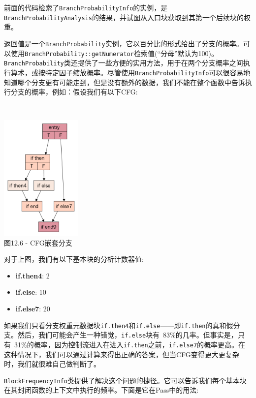 前面的代码检索了\texttt{BranchProbabilityInfo}的实例，是\texttt{BranchProbabilityAnalysis}的结果，并试图从入口块获取到其第一个后续块的权重。

返回值是一个\texttt{BranchProbability}实例，它以百分比的形式给出了分支的概率。可以使用\texttt{BranchProbability::getNumerator}检索值(“分母”默认为100)。\texttt{BranchProbability}类还提供了一些方便的实用方法，用于在两个分支概率之间执行算术，或按特定因子缩放概率。尽管使用\texttt{BranchProbabilityInfo}可以很容易地知道哪个分支更有可能走到，但是没有额外的数据，我们不能在整个函数中告诉执行分支的概率，例如：假设我们有以下CFG:

\hspace*{\fill} \\ %
\begin{center}
\includegraphics[width=0.3\textwidth]{content/3/chapter12/images/6.png}\\
图12.6 - CFG嵌套分支
\end{center}

对于上图，我们有以下基本块的分析计数器值:

\begin{itemize}
\ttfamily
\item \textbf{if.then4}: 2
\item \textbf{if.else}: 10
\item \textbf{if.else7}: 20
\end{itemize}

如果我们只看分支权重元数据块\texttt{if.then4}和\texttt{if.else}——即\texttt{if.then}的真和假分支。然后，我们可能会产生一种错觉，\texttt{if.else}块有~83\%的几率。但事实是，只有~31\%的概率，因为控制流进入在进入\texttt{if.then}之前，\texttt{if.else7}的概率更高。在这种情况下，我们可以通过计算来得出正确的答案，但当CFG变得更大更复杂时，我们就很难自己做判断了。

\texttt{BlockFrequencyInfo}类提供了解决这个问题的捷径。它可以告诉我们每个基本块在其封闭函数的上下文中执行的频率。下面是它在Pass中的用法:

